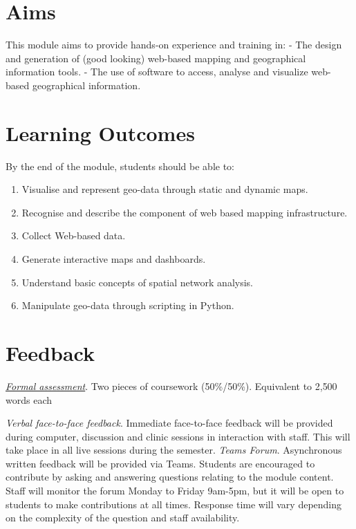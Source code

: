 \documentclass[
  letterpaper,
  DIV=11,
  numbers=noendperiod]{scrreprt}
\providecommand{\tightlist}{%
  \setlength{\itemsep}{0pt}\setlength{\parskip}{0pt}}\usepackage{longtable,booktabs,array}
\begin{document}
\hypertarget{aims}{%
\section*{Aims}\label{aims}}


This module aims to provide hands-on experience and training in: - The
design and generation of (good looking) web-based mapping and
geographical information tools. - The use of software to access, analyse
and visualize web-based geographical information.

\hypertarget{learning-outcomes}{%
\section*{Learning Outcomes}\label{learning-outcomes}}


By the end of the module, students should be able to:

\begin{enumerate}
\def\labelenumi{(\arabic{enumi})}
\setcounter{enumi}{1}
\tightlist
\item
  Visualise and represent geo-data through static and dynamic maps.
\item
  Recognise and describe the component of web based mapping
  infrastructure.
\item
  Collect Web-based data.
\item
  Generate interactive maps and dashboards.
\item
  Understand basic concepts of spatial network analysis.
\item
  Manipulate geo-data through scripting in Python.
\end{enumerate}

\hypertarget{feedback}{%
\section*{Feedback}\label{feedback}}


\href{https://gdsl-ul.github.io/wma/assess.html}{\emph{Formal
assessment}}. Two pieces of coursework (50\%/50\%). Equivalent to 2,500
words each

\emph{Verbal face-to-face feedback}. Immediate face-to-face feedback
will be provided during computer, discussion and clinic sessions in
interaction with staff. This will take place in all live sessions during
the semester. \emph{Teams Forum}. Asynchronous written feedback will be
provided via Teams. Students are encouraged to contribute by asking and
answering questions relating to the module content. Staff will monitor
the forum Monday to Friday 9am-5pm, but it will be open to students to
make contributions at all times. Response time will vary depending on
the complexity of the question and staff availability.
\end{document}
